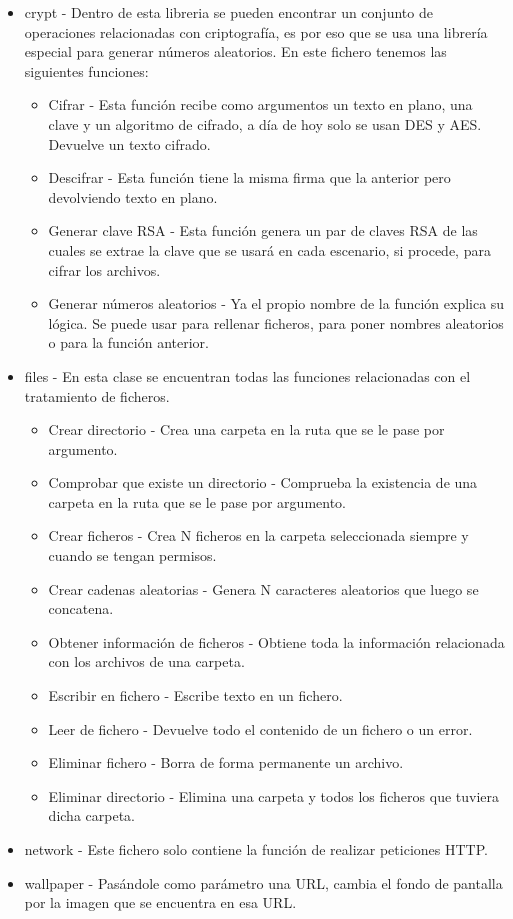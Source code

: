 \documentclass[a4paper,12pt]{article}
\begin{document}
\begin{itemize}
	\item crypt - Dentro de esta libreria se pueden encontrar un conjunto de operaciones relacionadas con criptografía, es por eso que se usa una librería especial para generar números aleatorios. En este fichero tenemos las siguientes funciones:
	\begin{itemize}
		\item Cifrar - Esta función recibe como argumentos un texto en plano, una clave y un algoritmo de cifrado, a día de hoy solo se usan DES y AES. Devuelve un texto cifrado.
		\item Descifrar - Esta función tiene la misma firma que la anterior pero devolviendo texto en plano.
		\item Generar clave RSA - Esta función genera un par de claves RSA de las cuales se extrae la clave que se usará en cada escenario, si procede, para cifrar los archivos.
		\item Generar números aleatorios - Ya el propio nombre de la función explica su lógica. Se puede usar para rellenar ficheros, para poner nombres aleatorios o para la función anterior.
	\end{itemize}
	\item files - En esta clase se encuentran todas las funciones relacionadas con el tratamiento de ficheros.
	\begin{itemize}
		\item Crear directorio - Crea una carpeta en la ruta que se le pase por argumento.
		\item Comprobar que existe un directorio - Comprueba la existencia de una carpeta en la ruta que se le pase por argumento.
		\item Crear ficheros - Crea N ficheros en la carpeta seleccionada siempre y cuando se tengan permisos.
		\item Crear cadenas aleatorias - Genera N caracteres aleatorios que luego se concatena.
		\item Obtener información de ficheros - Obtiene toda la información relacionada con los archivos de una carpeta.
		\item Escribir en fichero - Escribe texto en un fichero.
		\item Leer de fichero - Devuelve todo el contenido de un fichero o un error.
		\item Eliminar fichero - Borra de forma permanente un archivo.
		\item Eliminar directorio - Elimina una carpeta y todos los ficheros que tuviera dicha carpeta.
	\end{itemize}
	\item network - Este fichero solo contiene la función de realizar peticiones HTTP. 
	\item wallpaper - Pasándole como parámetro una URL, cambia el fondo de pantalla por la imagen que se encuentra en esa URL.
\end{itemize} 
\end{document}
